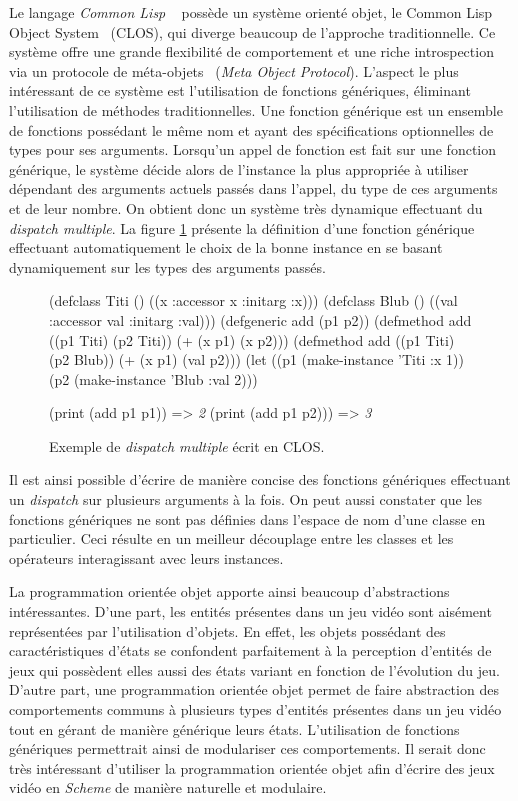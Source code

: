 \documentclass[12pt,twoside,letterpaper,francais]{book}
\newcommand{\clisp}{{\textit{Common Lisp }}}
\newcommand{\Schemelang}{{\textit{Scheme }}}
\newcommand{\schemeresult}[1]{{\it #1}}
\begin{document}
Le langage \clisp~\cite{CLISP} possède un système orienté objet, le
Common Lisp Object System~\cite{CLOS} (CLOS), qui diverge beaucoup de
l'approche traditionnelle. Ce système offre une grande flexibilité de
comportement et une riche introspection via un protocole de
méta-objets~\cite{MOP} (\textit{Meta Object Protocol}). L'aspect le
plus intéressant de ce système est l'utilisation de fonctions
génériques, éliminant l'utilisation de méthodes traditionnelles. Une
fonction générique est un ensemble de fonctions possédant le même nom
et ayant des spécifications optionnelles de types pour ses
arguments. Lorsqu'un appel de fonction est fait sur une fonction
générique, le système décide alors de l'instance la plus appropriée à
utiliser dépendant des arguments actuels passés dans l'appel, du type
de ces arguments et de leur nombre. On obtient donc un système très
dynamique effectuant du \textit{dispatch multiple}. La figure
\ref{OO:CLOS_ex} présente la définition d'une fonction générique
effectuant automatiquement le choix de la bonne instance en se basant
dynamiquement sur les types des arguments passés.

\begin{figure}[h!]
  \begin{schemecode}
(defclass Titi () ((x :accessor x :initarg :x)))
(defclass Blub () ((val :accessor val :initarg :val)))
(defgeneric add (p1 p2))
(defmethod add ((p1 Titi) (p2 Titi)) (+ (x p1) (x p2)))
(defmethod add ((p1 Titi) (p2 Blub)) (+ (x p1) (val p2)))
(let ((p1 (make-instance 'Titi :x 1))
      (p2 (make-instance 'Blub :val 2)))

  (print (add p1 p1))  => \schemeresult{2}
  (print (add p1 p2))) => \schemeresult{3}
  \end{schemecode}
  \caption{Exemple de \textit{dispatch multiple} écrit en CLOS.}
  \label{OO:CLOS_ex}
\end{figure}

Il est ainsi possible d'écrire de manière concise des fonctions
génériques effectuant un \textit{dispatch} sur plusieurs arguments à
la fois. On peut aussi constater que les fonctions génériques ne sont
pas définies dans l'espace de nom d'une classe en particulier. Ceci
résulte en un meilleur découplage entre les classes et les opérateurs
interagissant avec leurs instances.

La programmation orientée objet apporte ainsi beaucoup d'abstractions
intéressantes. D'une part, les entités présentes dans un jeu vidéo
sont aisément représentées par l'utilisation d'objets. En effet, les
objets possédant des caractéristiques d'états se confondent
parfaitement à la perception d'entités de jeux qui possèdent elles
aussi des états variant en fonction de l'évolution du jeu. D'autre
part, une programmation orientée objet permet de faire abstraction des
comportements communs à plusieurs types d'entités présentes dans un
jeu vidéo tout en gérant de manière générique leurs états.
L'utilisation de fonctions génériques permettrait ainsi de modulariser
ces comportements. Il serait donc très intéressant d'utiliser la
programmation orientée objet afin d'écrire des jeux vidéo en
\Schemelang de manière naturelle et modulaire.
\end{document}
